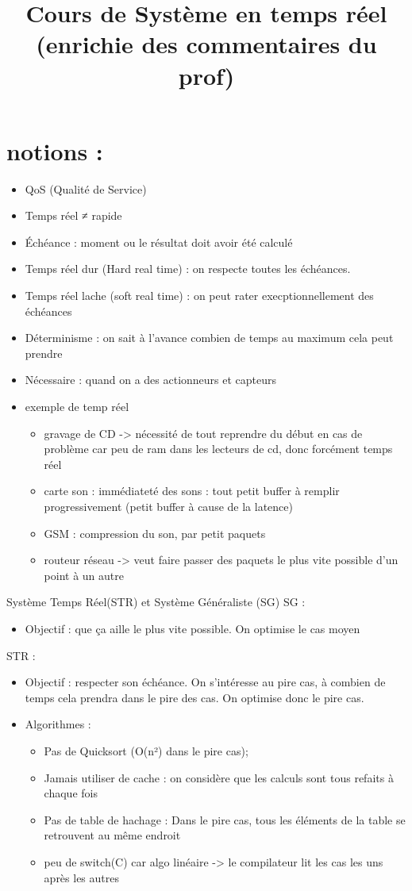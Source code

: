 \documentclass{article}
\title{Cours de Système en temps réel\\(enrichie des commentaires du prof)}
\begin{document}
\section{notions :}
	\begin{itemize}
	\item QoS (Qualité de Service)
	\item Temps réel ≠ rapide
	\item Échéance : moment ou le résultat doit avoir été calculé
	\item Temps réel dur (Hard real time) : on respecte toutes les échéances.
	\item Temps réel lache (soft real time) : on peut rater execptionnellement des échéances
	\item Déterminisme : on sait à l'avance combien de temps au maximum cela peut prendre
	\item Nécessaire : quand on a des actionneurs et capteurs
	\item exemple de temp réel
	\begin{itemize}: 
		\item gravage de CD -> nécessité de tout reprendre du début en cas de problème car peu de ram dans les lecteurs de cd, donc forcément temps réel
		\item carte son : immédiateté des sons : tout petit buffer à remplir progressivement (petit buffer à cause de la latence)
		\item GSM : compression du son, par petit paquets
		\item routeur réseau -> veut faire passer des paquets le plus vite possible d'un point à un autre
	\end{itemize}
\end{itemize}

Système Temps Réel(STR) et Système Généraliste (SG)
SG : 
\begin{itemize}
	\item Objectif : que ça aille le plus vite possible. On optimise le cas moyen
\end{itemize}
STR :
\begin{itemize}
	\item Objectif : respecter son échéance. On s'intéresse au pire cas, à combien de temps cela prendra dans le pire des cas. On optimise donc le pire cas.
	\item Algorithmes : 
	\begin{itemize}
		\item Pas de Quicksort (O(n²) dans le pire cas); 
		\item Jamais utiliser de cache : on considère que les calculs sont tous refaits à chaque fois
		\item Pas de table de hachage : Dans le pire cas, tous les éléments de la table se retrouvent au même endroit
		\item peu de switch(C) car algo linéaire -> le compilateur lit les cas les uns après les autres
	\end{itemize}
\end{itemize}
\end{document}
